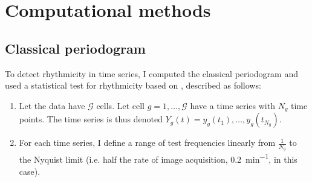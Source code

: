 \section{Computational methods}
\label{sec:methods-computational}

\subsection{Classical periodogram}
\label{subsec:methods-computational-periodogram}

To detect rhythmicity in time series, I computed the classical periodogram and used a statistical test for rhythmicity based on \textcite{glynnDetectingPeriodicPatterns2006a}, described as follows:

\begin{enumerate}
\item Let the data have $\mathcal{G}$ cells.
Let cell $g = 1, \dots{}, \mathcal{G}$ have a time series with $N_{g}$ time points.
The time series is thus denoted $Y_{g}(t) = y_{g}(t_{1}), \dots{}, y_{g}(t_{N_{g}})$.
\item For each time series, I define a range of test frequencies linearly from $\frac{1}{N_{g}}$ to the Nyquist limit (i.e. half the rate of image acquisition, \SI{0.2}{\minute^{-1}}, in this case).


\end{enumerate}
